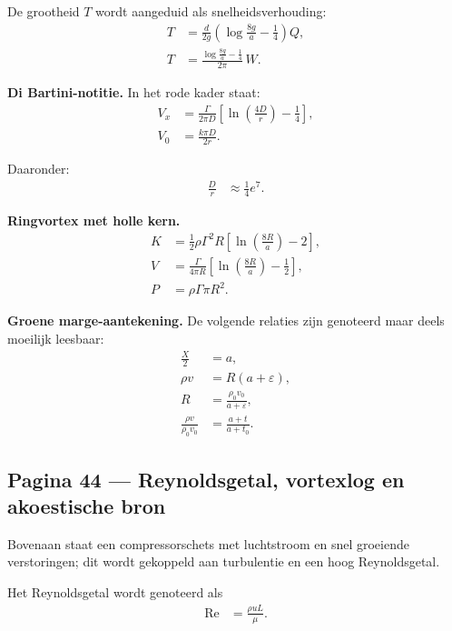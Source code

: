 \documentclass[11pt]{article}
\begin{document}
De grootheid $T$ wordt aangeduid als snelheidsverhouding:
\begin{align*}
T
  &=
  \frac{d}{2g}
  \left(
     \log\frac{8g}{a}
     -\frac{1}{4}
  \right)Q,\\
T
  &=
  \frac{\log\frac{8g}{a}-\frac{1}{4}}{2\pi}\,W.
\end{align*}

\textbf{Di Bartini-notitie.}
In het rode kader staat:
\begin{align*}
V_x
  &=
  \frac{\Gamma}{2\pi D}
  \left[
     \ln\left(\frac{4D}{r}\right)
     -\frac{1}{4}
  \right],\\
V_0
  &=
  \frac{k\pi D}{2r}.
\end{align*}

Daaronder:
\begin{align*}
\frac{D}{r}
  &\approx \frac{1}{4}e^7.
\end{align*}

\textbf{Ringvortex met holle kern.}
\begin{align*}
K
  &=
  \frac{1}{2}\rho\Gamma^2R
  \left[
     \ln\left(\frac{8R}{a}\right)-2
  \right],\\
V
  &=
  \frac{\Gamma}{4\pi R}
  \left[
     \ln\left(\frac{8R}{a}\right)-\frac{1}{2}
  \right],\\
P
  &=
  \rho\Gamma\pi R^2.
\end{align*}

\textbf{Groene marge-aantekening.}
De volgende relaties zijn genoteerd maar deels moeilijk leesbaar:
\begin{align*}
\frac{X}{2} &= a,\\
\rho v &= R(a+\varepsilon),\\
R &= \frac{\rho_0v_0}{a+\varepsilon},\\
\frac{\rho v}{\rho_0v_0}
  &=
  \frac{a+t}{a+t_0}.
\end{align*}

\subsection*{Pagina 44 --- Reynoldsgetal, vortexlog en akoestische bron}

Bovenaan staat een compressorschets met luchtstroom en snel groeiende verstoringen; dit wordt gekoppeld aan turbulentie en een hoog Reynoldsgetal.

Het Reynoldsgetal wordt genoteerd als
\begin{align*}
\mathrm{Re}
  &=
  \frac{\rho uL}{\mu}.
\end{align*}
\end{document}
